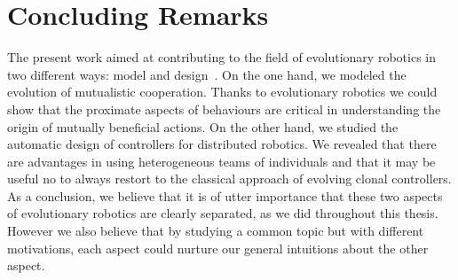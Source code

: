 \section{Concluding Remarks}

	The present work aimed at contributing to the field of evolutionary robotics in two different ways: model and design~\parencite{Trianni2014b, Doncieux2015a}. On the one hand, we modeled the evolution of mutualistic cooperation. Thanks to evolutionary robotics we could show that the proximate aspects of behaviours are critical in understanding the origin of mutually beneficial actions. On the other hand, we studied the automatic design of controllers for distributed robotics. We revealed that there are advantages in using heterogeneous teams of individuals and that it may be useful no to always restort to the classical approach of evolving clonal controllers. As a conclusion, we believe that it is of utter importance that these two aspects of evolutionary robotics are clearly separated, as we did throughout this thesis. However we also believe that by studying a common topic but with different motivations, each aspect could nurture our general intuitions about the other aspect.




